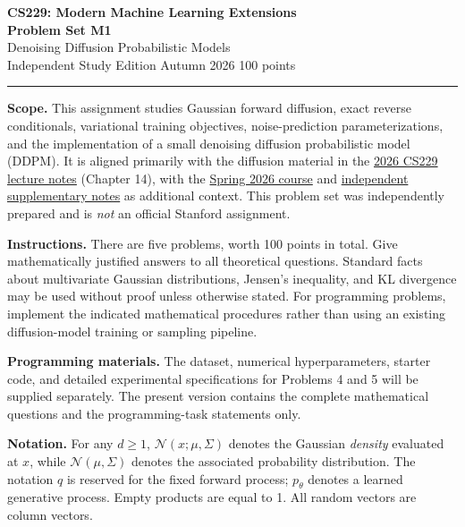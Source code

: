 \documentclass[11pt]{article}
\newcommand{\N}{\mathcal{N}}
\begin{document}
\begin{center}
  {\Large\bfseries CS229: Modern Machine Learning Extensions}\\[0.35em]
  {\LARGE\bfseries Problem Set M1}\\[0.2em]
  {\large Denoising Diffusion Probabilistic Models}\\[0.55em]
  {\small Independent Study Edition \textbullet{} Autumn 2026 \textbullet{} 100 points}
\end{center}
\vspace{0.2em}
\hrule
\vspace{0.75em}

\textbf{Scope.} This assignment studies Gaussian forward diffusion, exact reverse conditionals,
variational training objectives, noise-prediction parameterizations, and the implementation of a
small denoising diffusion probabilistic model (DDPM). It is aligned primarily with the diffusion
material in the \href{https://cs229.stanford.edu/main_notes.pdf}{2026 CS229 lecture notes}
(Chapter 14), with the \href{https://cs229.stanford.edu/index.html-spr26}{Spring 2026 course}
and \href{https://github.com/az9713/cs229-machine-learning-notes}{independent supplementary notes}
as additional context. This problem set was independently prepared and is \emph{not} an official
Stanford assignment.

\textbf{Instructions.} There are five problems, worth 100 points in total. Give mathematically
justified answers to all theoretical questions. Standard facts about multivariate Gaussian
distributions, Jensen's inequality, and KL divergence may be used without proof unless otherwise
stated. For programming problems, implement the indicated mathematical procedures rather than
using an existing diffusion-model training or sampling pipeline.

\textbf{Programming materials.} The dataset, numerical hyperparameters, starter code, and detailed
experimental specifications for Problems 4 and 5 will be supplied separately. The present version
contains the complete mathematical questions and the programming-task statements only.

\textbf{Notation.} For any \(d\ge 1\), \(\N(x;\mu,\Sigma)\) denotes the Gaussian \emph{density}
evaluated at \(x\), while \(\N(\mu,\Sigma)\) denotes the associated probability distribution.
The notation \(q\) is reserved for the fixed forward process; \(p_\theta\) denotes a learned
generative process. Empty products are equal to 1. All random vectors are column vectors.
\end{document}
